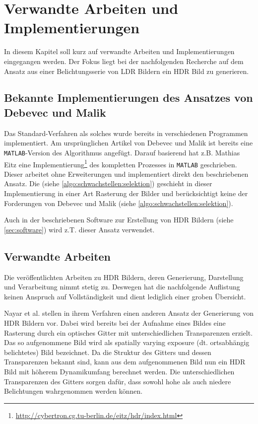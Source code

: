 \chapter{Verwandte Arbeiten und Implementierungen}
\label{chap:references}

In diesem Kapitel soll kurz auf verwandte Arbeiten und Implementierungen eingegangen werden. Der Fokus liegt bei der nachfolgenden Recherche auf dem Ansatz aus einer Belichtungsserie von \gls{LDR} Bildern ein \gls{HDR} Bild zu generieren.

\section{Bekannte Implementierungen des Ansatzes von Debevec und Malik}
\label{sec:implementations}
Das Standard-Verfahren als solches wurde bereits in verschiedenen Programmen implementiert. Am ursprünglichen Artikel von Debevec und Malik ist bereits eine \texttt{MATLAB}-Version des Algorithmus angefügt. 
Darauf basierend hat z.B. Mathias Eitz eine Implementierung\footnote{\url{http://cybertron.cg.tu-berlin.de/eitz/hdr/index.html}} des kompletten Prozesses in \texttt{MATLAB} geschrieben. Dieser arbeitet ohne Erweiterungen und implementiert direkt den beschriebenen Ansatz. Die  (siehe \autoref{algo:schwachstellen:selektion}) geschieht in dieser Implementierung in einer Art Rasterung der Bilder und berücksichtigt keine der Forderungen von Debevec und Malik (siehe \autoref{algo:schwachstellen:selektion}). 

Auch in der beschriebenen Software zur Erstellung von \gls{HDR} Bildern (siehe \autoref{sec:software}) wird z.T. dieser Ansatz verwendet.


\section{Verwandte Arbeiten}

Die veröffentlichten Arbeiten zu \gls{HDR} Bildern, deren Generierung, Darstellung und Verarbeitung nimmt stetig zu. Deswegen hat die nachfolgende Auflistung keinen Anspruch auf Vollständigkeit und dient lediglich einer groben Übersicht.

Nayar et al. \cite{Nayar00highdynamic} stellen in ihrem Verfahren einen anderen Ansatz der Generierung von \gls{HDR} Bildern vor. Dabei wird bereits bei der Aufnahme eines Bildes eine Rasterung durch ein optisches Gitter mit unterschiedlichen Transparenzen erzielt. Das so aufgenommene Bild wird als spatially varying exposure (dt. ortsabhängig belichtetes) Bild bezeichnet. Da die Struktur des Gitters und dessen Transparenzen bekannt sind, kann aus dem aufgenommenen Bild nun ein HDR Bild mit höherem Dynamikumfang berechnet werden. Die unterschiedlichen Transparenzen des Gitters sorgen dafür, dass sowohl hohe als auch niedere Belichtungen wahrgenommen werden können. 

